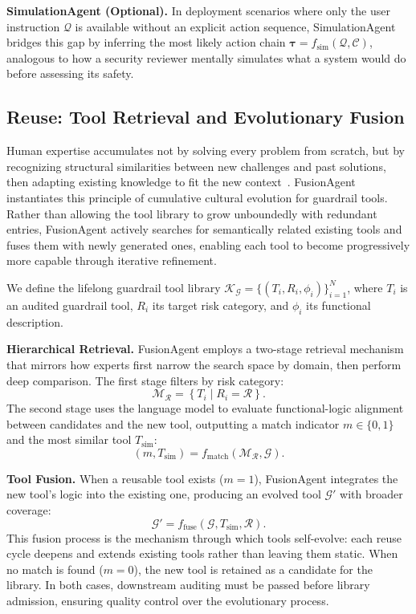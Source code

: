   \noindent\textbf{SimulationAgent (Optional).} In deployment scenarios where only the user instruction $\mathcal{Q}$ is available without an explicit action sequence, SimulationAgent bridges this gap by inferring the
  most likely action chain $\boldsymbol{\tau} = f_{\mathrm{sim}}(\mathcal{Q}, \mathcal{C})$, analogous to how a security reviewer mentally simulates what a system would do before assessing its safety.


  \subsection{Reuse: Tool Retrieval and Evolutionary Fusion}

  Human expertise accumulates not by solving every problem from scratch, but by recognizing structural similarities between new challenges and past solutions, then adapting existing knowledge to fit the new
  context~\citep{henrich2015secret}. FusionAgent instantiates this principle of cumulative cultural evolution for guardrail tools. Rather than allowing the tool library to grow unboundedly with redundant entries,
  FusionAgent actively searches for semantically related existing tools and fuses them with newly generated ones, enabling each tool to become progressively more capable through iterative refinement.

  We define the lifelong guardrail tool library $\mathcal{K}_{\mathcal{G}} = \{(T_i, R_i, \phi_i)\}_{i=1}^{N}$, where $T_i$ is an audited guardrail tool, $R_i$ its target risk category, and $\phi_i$ its functional
  description.

  \noindent\textbf{Hierarchical Retrieval.} FusionAgent employs a two-stage retrieval mechanism that mirrors how experts first narrow the search space by domain, then perform deep comparison. The first stage filters by
  risk category:
  \begin{equation}
      \mathcal{M}_{\mathcal{R}} = \left\{ T_i \mid R_i = \mathcal{R} \right\}.
  \end{equation}
  The second stage uses the language model to evaluate functional-logic alignment between candidates and the new tool, outputting a match indicator $m \in \{0, 1\}$ and the most similar tool $T_{\text{sim}}$:
  \begin{equation}
      (m, T_{\text{sim}}) = f_{\mathrm{match}}(\mathcal{M}_{\mathcal{R}}, \mathcal{G}).
  \end{equation}

  \noindent\textbf{Tool Fusion.} When a reusable tool exists ($m = 1$), FusionAgent integrates the new tool's logic into the existing one, producing an evolved tool $\mathcal{G}'$ with broader coverage:
  \begin{equation}
      \mathcal{G}' = f_{\mathrm{fuse}}(\mathcal{G}, T_{\text{sim}}, \mathcal{R}).
  \end{equation}
  This fusion process is the mechanism through which tools self-evolve: each reuse cycle deepens and extends existing tools rather than leaving them static. When no match is found ($m = 0$), the new tool is retained as a
   candidate for the library. In both cases, downstream auditing must be passed before library admission, ensuring quality control over the evolutionary process.


